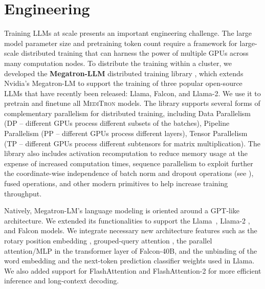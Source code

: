 \documentclass{article}
\newcommand{\llama}{\textnormal{Llama}}
\newcommand{\mtron}{\textsc{MediTron}\xspace}
\begin{document}
 \section{Engineering} \label{sec:design-consider}

Training LLMs at scale presents an important engineering challenge. The large model parameter size and pretraining token count require a framework for large-scale distributed training that can harness the power of multiple GPUs across many computation nodes. 
To distribute the training within a cluster, we developed the \textbf{Megatron-LLM} distributed training library \citep{epfmgtrn2023}, which extends Nvidia's Megatron-LM \citep{Shoeybi2019, Narayanan2021} to support the training of three popular open-source LLMs that have recently been released: \llama, Falcon, and \llama-2. We use it to pretrain and finetune all \mtron models. The library supports several forms of complementary parallelism for distributed training, including Data Parallelism (DP -- different GPUs process different subsets of the batches), Pipeline Parallelism (PP -- different GPUs process different layers), Tensor Parallelism (TP -- different GPUs process different subtensors for matrix multiplication).
The library also includes activation recomputation to reduce memory usage at the expense of increased computation times, sequence parallelism to exploit further the coordinate-wise independence of batch norm and dropout operations (see \citep{Korthikanti2022}), fused operations, and other modern primitives to help increase training throughput. 

Natively, Megatron-LM's language modeling is oriented around a GPT-like architecture. We extended its functionalities to support the \llama\ \citep{llama}, \llama-2 \citep{llama2}, and Falcon \citep{falcon40b} models. We integrate necessary new architecture features such as the rotary position embedding \citep{Chen2023}, grouped-query attention \citep{Ainslie2023}, the parallel attention/MLP in the transformer layer of Falcon-40B, and the unbinding of the word embedding and the next-token prediction classifier weights used in \llama. We also added support for FlashAttention \citep{dao2022flashattention} and FlashAttention-2 \citep{dao2023flashattention2} for more efficient inference and long-context decoding.
\end{document}
